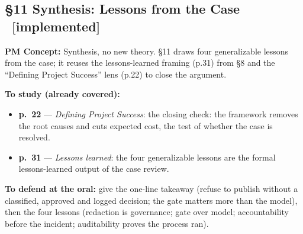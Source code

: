 \documentclass[12pt,a4paper]{article}
\newcommand{\statusdone}{\textcolor{donegreen}{\small\textbf{[implemented]}}}
\newcommand{\slide}[3]{\item \textbf{p.~#1} --- \textit{#2}: #3}
\newcommand{\concetto}[1]{\textbf{PM Concept:} #1\par\vspace{2pt}}
\begin{document}
\subsection{\S11 Synthesis: Lessons from the Case \ \statusdone}
\concetto{Synthesis, no new theory. \S11 draws four generalizable lessons from the case; it reuses the lessons-learned framing (p.31) from \S8 and the ``Defining Project Success'' lens (p.22) to close the argument.}
\textbf{To study (already covered):}
\begin{itemize}
  \slide{22}{Defining Project Success}{the closing check: the framework removes the root causes and cuts expected cost, the test of whether the case is resolved.}
  \slide{31}{Lessons learned}{the four generalizable lessons are the formal lessons-learned output of the case review.}
\end{itemize}
\textbf{To defend at the oral:} give the one-line takeaway (refuse to publish without a classified, approved and logged decision; the gate matters more than the model), then the four lessons (redaction is governance; gate over model; accountability before the incident; auditability proves the process ran).
\end{document}

